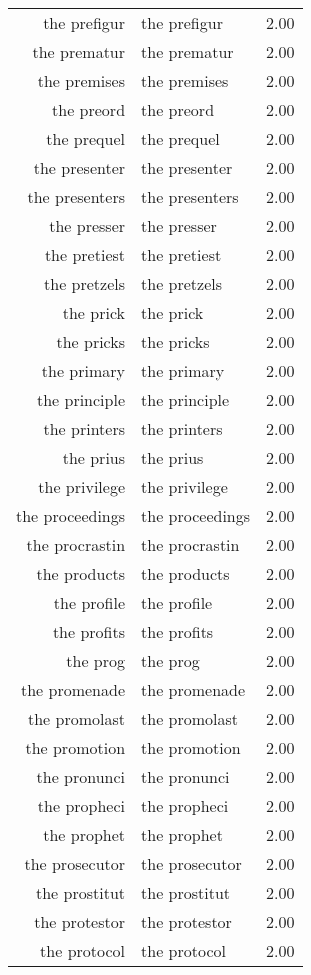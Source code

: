 \begin{table}[ht]
\begin{tabular}{rlr}
  the prefigur & the prefigur & 2.00 \\ 
  the prematur & the prematur & 2.00 \\ 
  the premises & the premises & 2.00 \\ 
  the preord & the preord & 2.00 \\ 
  the prequel & the prequel & 2.00 \\ 
  the presenter & the presenter & 2.00 \\ 
  the presenters & the presenters & 2.00 \\ 
  the presser & the presser & 2.00 \\ 
  the pretiest & the pretiest & 2.00 \\ 
  the pretzels & the pretzels & 2.00 \\ 
  the prick & the prick & 2.00 \\ 
  the pricks & the pricks & 2.00 \\ 
  the primary & the primary & 2.00 \\ 
  the principle & the principle & 2.00 \\ 
  the printers & the printers & 2.00 \\ 
  the prius & the prius & 2.00 \\ 
  the privilege & the privilege & 2.00 \\ 
  the proceedings & the proceedings & 2.00 \\ 
  the procrastin & the procrastin & 2.00 \\ 
  the products & the products & 2.00 \\ 
  the profile & the profile & 2.00 \\ 
  the profits & the profits & 2.00 \\ 
  the prog & the prog & 2.00 \\ 
  the promenade & the promenade & 2.00 \\ 
  the promolast & the promolast & 2.00 \\ 
  the promotion & the promotion & 2.00 \\ 
  the pronunci & the pronunci & 2.00 \\ 
  the propheci & the propheci & 2.00 \\ 
  the prophet & the prophet & 2.00 \\ 
  the prosecutor & the prosecutor & 2.00 \\ 
  the prostitut & the prostitut & 2.00 \\ 
  the protestor & the protestor & 2.00 \\ 
  the protocol & the protocol & 2.00 \\ 

\end{tabular}
\end{table}
